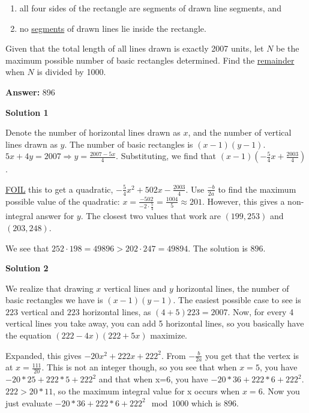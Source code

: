 \begin{enumerate}
 
            \begin{enumerate}[label=(\roman*)]
                \item  all four sides of the rectangle are segments of drawn line segments, and
\item  no \href{https://artofproblemsolving.com/wiki/index.php?title=Segment}{segments} of drawn lines lie inside the rectangle.
            \end{enumerate}
            Given that the total length of all lines drawn is exactly 2007 units, let $N$ be the maximum possible number of basic rectangles determined. Find the \href{https://artofproblemsolving.com/wiki/index.php?title=Remainder}{remainder} when $N$ is divided by 1000.


 
 \textbf{Answer: }896



\textbf{Solution 1}

Denote the number of horizontal lines drawn as $x$, and the number of vertical lines drawn as $y$. The number of basic rectangles is $(x - 1)(y - 1)$. $5x + 4y = 2007 \Longrightarrow y = \frac{2007 - 5x}{4}$. Substituting, we find that $(x - 1)\left(-\frac 54x + \frac{2003}4\right)$.

 \href{https://artofproblemsolving.com/wiki/index.php?title=FOIL}{FOIL} this to get a quadratic, $-\frac 54x^2 + 502x - \frac{2003}4$. Use $\frac{-b}{2a}$ to find the maximum possible value of the quadratic: $x = \frac{-502}{-2 \cdot \frac 54} = \frac{1004}5 \approx 201$. However, this gives a non-integral answer for $y$. The closest two values that work are $(199,253)$ and $(203,248)$. 

 We see that $252 \cdot 198 = 49896 > 202 \cdot 247 = 49894$. The solution is $\boxed{896}$.

 



\textbf{Solution 2}

We realize that drawing $x$ vertical lines and $y$ horizontal lines, the number of basic rectangles we have is $(x-1)(y-1)$. The easiest possible case to see is $223$ vertical and $223$ horizontal lines, as $(4+5)223 = 2007$. Now, for every 4 vertical lines you take away, you can add 5 horizontal lines, so you basically have the equation $(222-4x)(222+5x)$ maximize. 

 Expanded, this gives $-20x^{2}+222x+222^{2}$. From $-\frac{b}{2a}$ you get that the vertex is at $x=\frac{111}{20}$. This is not an integer though, so you see that when $x=5$, you have $-20*25+222*5+222^{2}$ and that when x=6, you have $-20*36+222*6+222^{2}$. $222 > 20*11$, so the maximum integral value for x occurs when $x=6$. Now you just evaluate $-20*36+222*6+222^{2}\mod 1000$ which is ${896}$.


\end{enumerate}
